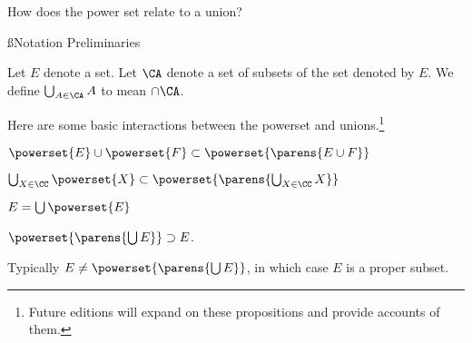 

How does the power set relate to a union?

\ss{Notation Preliminaries}

Let $E$ denote a set.
Let $\CA$ denote a set of subsets of the set denoted by $E$.
We define $\bigcup_{A \in \CA} A$ to mean $\cap \CA$.


Here are some basic interactions between the powerset and unions.\footnote{Future editions will expand on these propositions and provide accounts of them.}

\begin{proposition}
$\powerset{E} \cup \powerset{F} \subset \powerset{\parens{E \cup F}}$
\end{proposition}

\begin{proposition}
$\bigcup_{X \in \CC} \powerset{X} \subset \powerset{\parens{\bigcup_{X \in \CC} X}}$
\end{proposition}

\begin{proposition}
  $E = \bigcup \powerset{E}$
\end{proposition}

\begin{proposition}
  $\powerset{\parens{\bigcup E}} \supset E$.
\end{proposition}
Typically $E \neq \powerset{\parens{\bigcup E}}$, in which case $E$ is a proper subset.

\blankpage
